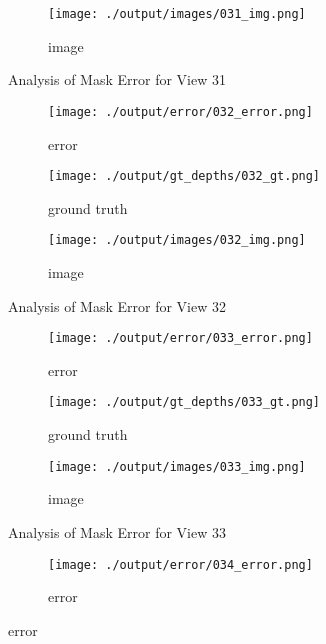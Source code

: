 \documentclass{article}
\begin{document}
\begin{figure}
\begin{subfigure}{0.3\textwidth}
		\centering
		\texttt{[image: ./output/images/031\_img.png]}
		\caption{image}
		\label{fig:img31}
	\end{subfigure}
	\hfill
	\caption{Analysis of Mask Error for View 31}
	\label{fig:error_analys31}
\end{figure}\begin{figure}
	\centering
	\begin{subfigure}{0.3\textwidth}
		\centering
		\texttt{[image: ./output/error/032\_error.png]}
		\caption{error}
		\label{fig:error32}
	\end{subfigure}
	\hfill
	\centering
	\begin{subfigure}{0.3\textwidth}
		\centering
		\texttt{[image: ./output/gt\_depths/032\_gt.png]}
		\caption{ground truth}
		\label{fig:gt32}
	\end{subfigure}
	\hfill
	\centering
	\begin{subfigure}{0.3\textwidth}
		\centering
		\texttt{[image: ./output/images/032\_img.png]}
		\caption{image}
		\label{fig:img32}
	\end{subfigure}
	\hfill
	\caption{Analysis of Mask Error for View 32}
	\label{fig:error_analys32}
\end{figure}\begin{figure}
	\centering
	\begin{subfigure}{0.3\textwidth}
		\centering
		\texttt{[image: ./output/error/033\_error.png]}
		\caption{error}
		\label{fig:error33}
	\end{subfigure}
	\hfill
	\centering
	\begin{subfigure}{0.3\textwidth}
		\centering
		\texttt{[image: ./output/gt\_depths/033\_gt.png]}
		\caption{ground truth}
		\label{fig:gt33}
	\end{subfigure}
	\hfill
	\centering
	\begin{subfigure}{0.3\textwidth}
		\centering
		\texttt{[image: ./output/images/033\_img.png]}
		\caption{image}
		\label{fig:img33}
	\end{subfigure}
	\hfill
	\caption{Analysis of Mask Error for View 33}
	\label{fig:error_analys33}
\end{figure}\begin{figure}
	\centering
	\begin{subfigure}{0.3\textwidth}
		\centering
		\texttt{[image: ./output/error/034\_error.png]}
		\caption{error}
		\label{fig:error34}
	\end{subfigure}

\end{figure}
\end{document}
